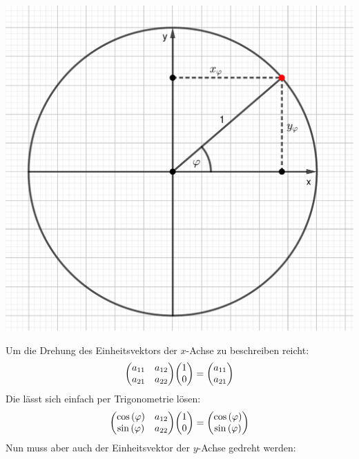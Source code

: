 \documentclass{theozettel}
\begin{document}
\begin{center}
\includegraphics[scale=0.4]{Theo07-4a)_1.pdf}
\end{center}
Um die Drehung des Einheitsvektors der $x$-Achse zu beschreiben reicht:
\begin{align*}
\mqty(a_{11} & a_{12}\\ a_{21} &a_{22})\mqty(1 \\ 0)=\mqty(a_{11}\\ a_{21})
\end{align*}
Die lässt sich einfach per Trigonometrie lösen:
\begin{align*}
\mqty(\cos\left(\varphi\right) & a_{12}\\ \sin\left(\varphi\right) &a_{22})\mqty(1 \\ 0)=\mqty(\cos\left(\varphi\right)\\\sin\left(\varphi\right))
\end{align*}
Nun muss aber auch der Einheitsvektor der $y$-Achse gedreht werden:
\end{document}
